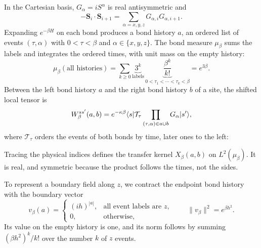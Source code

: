 In the Cartesian basis, $G_\alpha=iS^\alpha$ is real antisymmetric and
\[
    -\bm S_i\cdot\bm S_{i+1}
    =\sum_{\alpha=x,y,z}G_{\alpha,i}G_{\alpha,i+1}.
\]
Expanding $e^{-\beta H}$ on each bond produces a bond history $a$, an
ordered list of events $(\tau,\alpha)$ with $0<\tau<\beta$ and
$\alpha\in\{x,y,z\}$. The bond measure $\mu_\beta$ sums the labels and
integrates the ordered times, with unit mass on the empty history:
\[
    \mu_\beta(\text{all histories})
    =\sum_{k\ge0}\underbrace{3^k}_{\text{labels}}\,
    \underbrace{\frac{\beta^k}{k!}}_{0<\tau_1<\cdots<\tau_k<\beta}
    =e^{3\beta}.
\]
Between the left bond history $a$ and the right bond history $b$ of a
site, the shifted local tensor is
\begin{equation}
    W_\beta^{ss'}(a,b)
    =e^{-\kappa\beta}
    \langle s|\mathcal T_\tau
    \prod_{(\tau,\alpha)\in a\cup b}G_\alpha|s'\rangle,
    \label{obc:local}
\end{equation}
where $\mathcal T_\tau$ orders the events of both bonds by time, later
ones to the left:
\begin{proofdiagram}
    \worldlinekernel
\end{proofdiagram}
Tracing the physical indices defines the transfer kernel $X_\beta(a,b)$
on $L^2(\mu_\beta)$. It is real, and symmetric because the product
follows the times, not the sides.

To represent a boundary field along $z$, we contract the endpoint bond
history with the boundary vector
\begin{equation}
    v_\beta(a)=
    \begin{cases}
        (ih)^{|a|}, & \text{all event labels are }z, \\
        0,          & \text{otherwise},
    \end{cases}
    \qquad \|v_\beta\|^2=e^{\beta h^2}.
    \label{obc:vector}
\end{equation}
Its value on the empty history is one, and its norm follows by summing
$(\beta h^2)^k/k!$ over the number $k$ of $z$ events.

